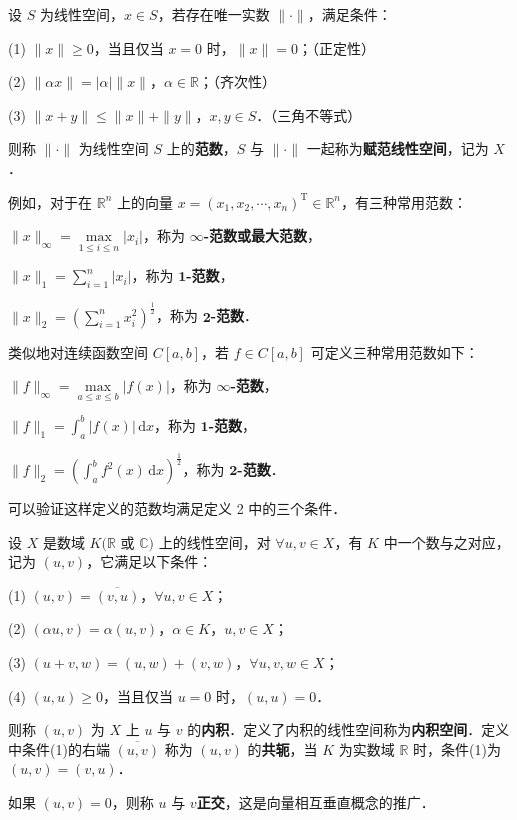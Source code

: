 \documentclass[../../main.tex]{subfiles}%
\begin{document}
\begin{definition}[范数]
设 \( S \) 为线性空间，\( x \in S \)，若存在唯一实数 \( \|\cdot\| \)，满足条件：

(1) \( \|x\| \geqslant 0 \)，当且仅当 \( x = 0 \) 时，\( \|x\| = 0 \)；（正定性）

(2) \( \|\alpha x\| = |\alpha| \|x\| \)，\( \alpha \in \mathbb{R} \)；（齐次性）

(3) \( \|x + y\| \leqslant \|x\| + \|y\| \)，\( x, y \in S \)．（三角不等式）

则称 \( \|\cdot\| \) 为线性空间 \( S \) 上的\textbf{范数}，\( S \) 与 \( \|\cdot\| \) 一起称为\textbf{赋范线性空间}，记为 \( X \)．
\end{definition}
\begin{note}
例如，对于在 \( \mathbb{R}^n \) 上的向量 \( x = (x_1, x_2, \cdots, x_n)^{\mathrm{T}} \in \mathbb{R}^n \)，有三种常用范数：

\( \|x\|_{\infty} = \max\limits_{1 \leqslant i \leqslant n} |x_i| \)，称为 \( \mathbb{\infty } \)\textbf{-范数或最大范数}，

\( \|x\|_1 = \sum\limits_{i=1}^n |x_i| \)，称为 $\mathbf{1}$\textbf{-范数}，

\( \|x\|_2 = \left( \sum\limits_{i=1}^n x_i^2 \right)^{\frac{1}{2}} \)，称为 $\mathbf{2}$\textbf{-范数}．

类似地对连续函数空间 \( C[a,b] \)，若 \( f \in C[a,b] \) 可定义三种常用范数如下：

\( \|f\|_{\infty} = \max\limits_{a \leqslant x \leqslant b} |f(x)| \)，称为 \( \mathbb{\infty }\)\textbf{-范数}，

\( \|f\|_1 = \int_a^b |f(x)| \, \mathrm{d}x \)，称为 $\mathbf{1}$\textbf{-范数}，

\( \|f\|_2 = \left( \int_a^b f^2(x) \, \mathrm{d}x \right)^{\frac{1}{2}} \)，称为 $\mathbf{2}$\textbf{-范数}．

可以验证这样定义的范数均满足定义 2 中的三个条件．
\end{note}

\begin{definition}
设 \( X \) 是数域 \( K(\mathbb{R} \) 或 \( \mathbb{C}) \) 上的线性空间，对 \( \forall u, v \in X \)，有 \( K \) 中一个数与之对应，记为 \( (u, v) \)，它满足以下条件：

(1) \( (u, v) = \overline{(v, u)} \)，\( \forall u, v \in X \)；

(2) \( (\alpha u, v) = \alpha (u, v) \)，\( \alpha \in K \)，\( u, v \in X \)；

(3) \( (u + v, w) = (u, w) + (v, w) \)，\( \forall u, v, w \in X \)；

(4) \( (u, u) \geqslant 0 \)，当且仅当 \( u = 0 \) 时，\( (u, u) = 0 \)．

则称 \( (u, v) \) 为 \( X \) 上 \( u \) 与 \( v \) 的\textbf{内积}．定义了内积的线性空间称为\textbf{内积空间}．定义中条件(1)的右端 \( \overline{(u, v)} \) 称为 \( (u, v) \) 的\textbf{共轭}，当 \( K \) 为实数域 \( \mathbb{R} \) 时，条件(1)为 \( (u, v) = (v, u) \)．

如果 \( (u, v) = 0 \)，则称 \( u \) 与 \( v \)\textbf{正交}，这是向量相互垂直概念的推广．
\end{definition}
\end{document}
